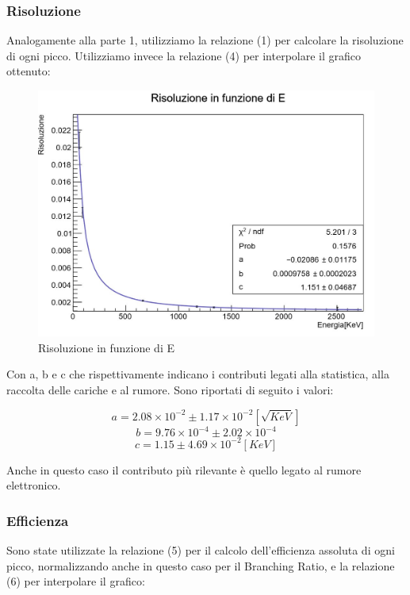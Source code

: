 \documentclass[a4paper,10pt]{article}
\begin{document}
\subsubsection{Risoluzione}
Analogamente alla parte 1, utilizziamo la relazione (1) per calcolare la risoluzione di ogni picco. Utilizziamo invece la relazione (4) per interpolare il grafico ottenuto:

\begin{figure}[H]
    \centering
    \includegraphics[scale=0.45]{grafici/risoluzionemultigamma}
    \caption{Risoluzione in funzione di E}
\end{figure}

Con a, b e c che rispettivamente indicano i contributi legati alla statistica, alla raccolta delle cariche e al rumore. Sono riportati di seguito i valori:

$$
	a=2.08 \times 10^{-2} \pm 1.17 \times 10^{-2} [\sqrt{KeV}]
$$
$$
	b=9.76 \times 10^{-4} \pm 2.02 \times 10^{-4}
$$
$$
	c= 1.15 \pm 4.69 \times 10^{-2} [KeV]
$$

Anche in questo caso il contributo più rilevante è quello legato al rumore elettronico.

\subsubsection{Efficienza}
Sono state utilizzate la relazione (5) per il calcolo dell'efficienza assoluta di ogni picco, normalizzando anche in questo caso per il Branching Ratio, e la relazione (6) per interpolare il grafico:
\end{document}
